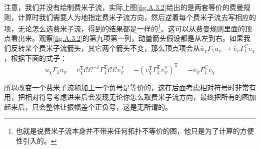 注意，我们并没有绘制费米子流，实际上图\ref{fig.A.3.2}给出的是两套等价的费曼规则，计算时我们需要人为地指定费米子流方向，然后逆着每个费米子流去写相应的项，无论怎么选费米子流，得到的结果都是一样的\footnote{也就是说费米子流本身并不带来任何拓扑不等价的图，他只是为了计算的方便性引入的。}。这可以从费曼规则里面的顶点看出来。观察\ref{fig.A.3.2}的第九项第一列，动量箭头假设都是从左到右。如果我们反转某个费米子流箭头，其它两个箭头不变，那么顶点项会从${\bar u}_\chi \Gamma_1 u_\psi \to{\bar v}_{\psi} \Gamma_1^C{{v}}_\chi$，根据下面的式子：
\begin{equation}\label{A.5}
		{\bar u}_\chi \Gamma_1 u_\psi= v_\chi^{\mathrm{T}}\mathcal{C} \mathcal{C}^{-1}\Gamma_1^\mathrm{T} \mathcal{C}\mathcal{C}\bar{v}^{\mathrm{T}}_{\psi}=-\left(v_\chi^{\mathrm{T}}\Gamma_1^\mathrm{T} \bar{v}^{\mathrm{T}}_{\psi}\right)^{\mathrm{T}}
		=-{\bar v}_{\psi} \Gamma_1^C{{v}}_\chi
\end{equation}

所以改变一个费米子流和加上一个负号是等价的，这在后面考虑相对符号时非常有用，把相对符号考虑进来后会发现无论你怎么取费米子流方向，最终把所有的图加起来后，只会整体让振幅差个正负号，这是无所谓的。

